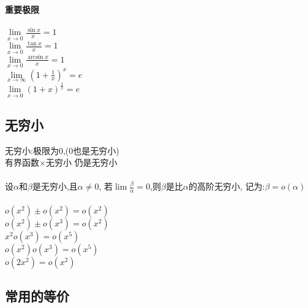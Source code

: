 \documentclass{article}
\begin{document}
\begin{flushleft}
	\paragraph{重要极限}
	$\lim\limits_{x\to 0} \frac{\sin x}{x}=1$\\
	$\lim\limits_{x\to 0} \frac{\tan x}{x}=1$\\
	$\lim\limits_{x\to 0} \frac{\arcsin x}{x}=1$\\
	$\lim\limits_{x\to \infty} (1+\frac{1}{x})^x=e$\\
	$\lim\limits_{x\to 0} (1+x)^{\frac{1}{x}}=e$\\
	
	\subsection{无穷小}
	
	无穷小:极限为0,(0也是无穷小)\\
	有界函数$\times$无穷小 仍是无穷小\\
	~\\
	设$\alpha$和$\beta$是无穷小,且$\alpha \neq 0$,
	若$\lim \frac{\beta}{\alpha}=0$,则$\beta$是比$\alpha$的高阶无穷小,
	记为:$\beta = o(\alpha)$\\
	~\\
	$o(x^2)\pm o(x^2)=o(x^2)$\\
	$o(x^2)\pm o(x^3)=o(x^2)$\\
	$x^2 o(x^3)=o(x^5)$\\
	$o(x^2) o(x^3)=o(x^5)$\\
	$o(2x^2)=o(x^2)$\\
	
	\subsection{常用的等价}
	

\end{flushleft}
\end{document}
